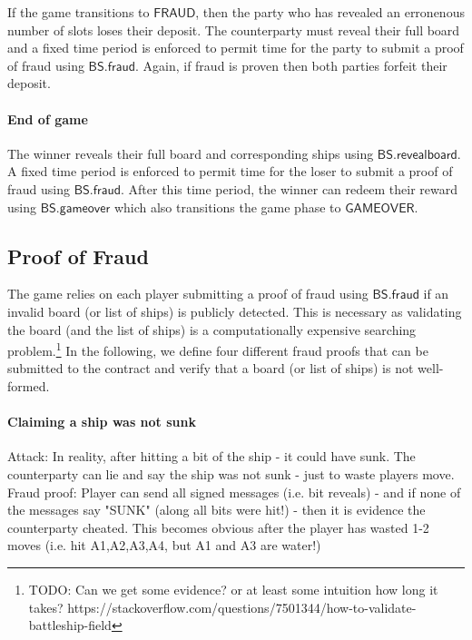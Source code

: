 \documentclass{llncs}
\newcommand{\gamefraud}{\mathsf{FRAUD}}
\newcommand{\gamefinished}{\mathsf{GAMEOVER}}
\newcommand{\battleshipfraud}{\mathsf{BS.fraud}}
\newcommand{\battleshiprevealboard}{\mathsf{BS.revealboard}}
\newcommand{\battleshipgameover}{\mathsf{BS.gameover}}
\begin{document}
If the game transitions to $\gamefraud$, then the party who has revealed an erronenous number of slots loses their deposit.
The counterparty must reveal their full board and a fixed time period is enforced to permit time for the party to submit a proof of fraud using $\battleshipfraud$. 
Again, if fraud is proven then both parties forfeit their deposit. 

\paragraph{End of game} 

The winner reveals their full board and corresponding ships using $\battleshiprevealboard$.
A fixed time period is enforced to permit time for the loser to submit a proof of fraud using $\battleshipfraud$.
After this time period, the winner can redeem their reward using $\battleshipgameover$ which also transitions the game phase to $\gamefinished$. 


\subsection{Proof of Fraud}

The game relies on each player submitting a proof of fraud using $\battleshipfraud$ if an invalid board (or list of ships) is publicly detected.
This is necessary as validating the board (and the list of ships) is a computationally expensive searching problem.\footnote{TODO: Can we get some evidence? or at least some intuition how long it takes? https://stackoverflow.com/questions/7501344/how-to-validate-battleship-field }  
In the following, we define four different fraud proofs that can be submitted to the contract and verify that a board (or list of ships) is not well-formed. 

\paragraph{Claiming a ship was not sunk}

Attack: In reality, after hitting a bit of the ship - it could have sunk. The counterparty can lie and say the ship was not sunk - just to waste players move. 
Fraud proof: Player can send all signed messages (i.e. bit reveals) - and if none of the messages say "SUNK" (along all bits were hit!) - then it is evidence the counterparty cheated. This becomes obvious after the player has wasted 1-2 moves (i.e. hit A1,A2,A3,A4, but A1 and A3 are water!) 
\end{document}
